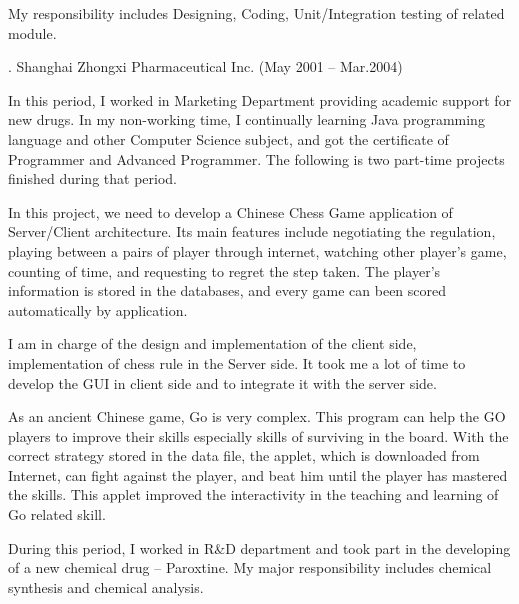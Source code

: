 My responsibility includes Designing, Coding, Unit/Integration testing of related module. 

. Shanghai Zhongxi Pharmaceutical Inc. (May 2001 -- Mar.2004)\par

\noindent
In this period, I worked in Marketing Department providing academic support for new drugs. 
In my non-working time, I continually learning Java programming language 
and other Computer Science subject, and got the certificate of Programmer 
and Advanced Programmer. The following is two part-time projects finished during that period.


In this project, we need to develop a Chinese Chess Game application 
of Server/Client architecture. Its main features include negotiating 
the regulation, playing between a pairs of player through internet, 
watching other player's game, counting of time, and requesting to regret
 the step taken. The player's information is stored in the databases,
  and every game can been scored automatically by application. 

I am in charge of the design and implementation of the client side, 
implementation of chess rule in the Server side. It took me a lot of 
time to develop the GUI in client side and to integrate it with the
 server side. 


As an ancient Chinese game, Go is very complex. This program can help the
GO players to improve their skills especially skills of surviving 
in the board. With
the correct strategy stored in the data file, the applet, which is
 downloaded from Internet, can fight against the player, and beat him 
 until the player has mastered the skills. This applet improved the 
 interactivity in the teaching and learning of Go related skill. 



\par

\noindent
During this period, I worked in R\&D department and took part in the 
developing of a new chemical drug -- Paroxtine. My major responsibility 
includes chemical synthesis and chemical analysis. 

